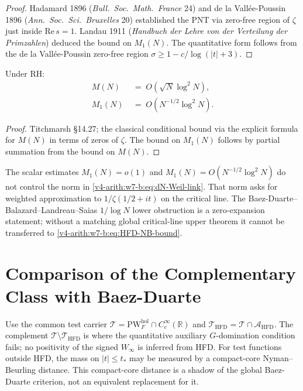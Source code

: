 \begin{proof}
Hadamard 1896 (\emph{Bull.~Soc.~Math.~France} 24) and
de la Vall\'ee-Poussin 1896 (\emph{Ann.~Soc.~Sci.~Bruxelles} 20)
established the PNT via zero-free region of \(\zeta\) just inside
\(\mathrm{Re}\,s=1\). Landau 1911
(\emph{Handbuch der Lehre von der Verteilung der Primzahlen})
deduced the bound on \(M_{1}(N)\). The quantitative form follows from
the de la Vall\'ee-Poussin zero-free region
\(\sigma\geq 1-c/\log(|t|+3)\).
\end{proof}

\begin{proposition}
\label{v4-arith:w7-b:prop:mertens-cond}
Under RH:
\begin{align}
\label{v4-arith:w7-b:eq:M-RH}
M(N)&\;=\;O(\sqrt{N}\log^{2}N),\\
\label{v4-arith:w7-b:eq:M1-RH}
M_{1}(N)&\;=\;O(N^{-1/2}\log^{2}N).
\end{align}
\end{proposition}

\begin{proof}
Titchmarsh \S14.27; the classical conditional bound via the explicit
formula for \(M(N)\) in terms of zeros of \(\zeta\). The bound on
\(M_{1}(N)\) follows by partial summation from the bound on \(M(N)\).
\end{proof}

\begin{remark}
\label{v4-arith:w7-b:rem:no-feedback}
The scalar estimates \(M_{1}(N)=o(1)\) and
\(M_{1}(N)=O(N^{-1/2}\log^{2}N)\) do not control the norm in
\eqref{v4-arith:w7-b:eq:dN-Weil-link}. That norm asks for weighted
approximation to \(1/\zeta(1/2+it)\) on the critical line. The
Baez-Duarte--Balazard--Landreau--Saias \(1/\log N\) lower obstruction
is a zero-expansion statement; without a matching global critical-line
upper theorem it cannot be transferred to
\eqref{v4-arith:w7-b:eq:HFD-NB-bound}.
\end{remark}

\section{Comparison of the Complementary Class with Baez-Duarte}
\label{v4-arith:w7-b:complementary-class}

Use the common test carrier
\(\mathscr T=\mathrm{PW}^{\mathrm{hol}}_F\cap C_c^\infty(\mathbb R)\)
and \(\mathscr T_{\mathrm{HFD}}=\mathscr T\cap\mathscr A_{\mathrm{HFD}}\).
The complement \(\mathscr T\setminus\mathscr T_{\mathrm{HFD}}\)
is where the quantitative auxiliary \(G\)-domination condition fails;
no positivity of the signed \(W_\infty\) is inferred from HFD.
For test functions outside HFD, the mass on
\(|t|\leq t_{\ast}\) may be measured by a compact-core
Nyman--Beurling distance. This compact-core distance is a shadow of the
global Baez-Duarte criterion, not an equivalent replacement for it.

